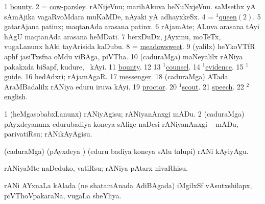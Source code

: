 \noindent
\gl{\pagu}
\expl{}
\bmng
\bnum
\num{1}  \hyperref{kandict_b.pdf}{B}{bounty pagu(2)}{bounty}. 
\num{2}  = \hyperref{kandict_c.pdf}{C}{cow-parsley}{cow-parsley}. 
  
\banum
{} rANijeVnu; marihAkuva heNuNxjeVnu. 
 saMsethx yA sAmAjika vagaRvoMdara muKaMDe, nAyaki yA adhayxkeSx. 
\eanum
\numie
\num{4}  = \hyperlink{queen(1)2}{$^1$queen\((2)\)}. 
\num{5}  gatarAjana patinx; maqtanAda arasana patinx. 
\num{6}  rAjamAte; ALuva arasana tAyi hAgU maqtanAda arasana heMDati. 
\num{7}  berxDuDx, jAyxmu, moTeTx, \mo vugaLanunx hAki tayArisida kaDubu. 
\num{8}  = \hyperref{kandict_m.pdf}{M}{meadowsweet}{meadowsweet}. 
\num{9}  (\UK yalilx) heYkoVTfR aphf jasiTxsfna oMdu viBAga, piVTha. 
\num{10}  (caduraMga) maNeyalilx rANiya pakakxda biSapf, kudure, \mo\ kAyi. 
\num{11}  \hyperref{kandict_b.pdf}{B}{bounty pagu(3)}{bounty}. 
\num{12}  
\num{13}  \hyperref{kandict_c.pdf}{C}{counsel(1) pagu(2)}{$^1$counsel}. 
\num{14}  \hyperref{kandict_e.pdf}{E}{evidence(1) nuga}{$^1$evidence}. 
\num{15}  \hyperref{kandict_g.pdf}{G}{guide(1) pagu}{$^1$guide}. 
\num{16}  hedAdxri; rAjamAgaR. 
\num{17}  \hyperref{kandict_m.pdf}{M}{messenger pagu(2)}{messenger}. 
\num{18}  (caduraMga) ATada AraMBadalilx rANiya eduru iruva kAyi. 
\num{19}  \hyperref{kandict_p.pdf}{P}{proctor pagu}{proctor}. 
\num{20}  \hyperref{kandict_s.pdf}{S}{scout(1) pagu}{$^1$scout}. 
\num{21}  \hyperref{kandict_s.pdf}{S}{speech pagu(5)}{speech}. 
\num{22}  \hyperref{kandict_e.pdf}{E}{english(2) pagu(6)}{$^2$english}. 
\enum
\emng
\eentry

\bentry
{} 
\gl{\sakirx}
\expl{}
\bmng
\bnum
\num{1} (heMgasobabxLanunx) rANiyAgisu; rANiyanAnxgi mADu. 
\num{2} (caduraMga) pAyxdeyanunx edurubadiya koneya sAlige naDesi rANiyanAnxgi -- mADu, parivatiRsu; rANikAyAgisu. 
\enum
\emng

\noindent
\gl{\akirx}
\bmng
(caduraMga) (pAyxdeya \vi) (eduru badiya koneya sAlu talupi) rANi kAyiyAgu. 
\emng

\noindent
\gl{\pagu}
\bmng
{} rANiyaMte naDeduko, vatiRsu; rANiya pAtarx nivaRhisu. 
\emng
\eentry

\bentry
{} 
\gl{\gu}
\expl{}
\bmng
rANi AYxnaLa kAlada (ne shatamAnada AdiBAgada) iMgilxSf vAsutxshilapx, piVThoVpakaraNa, \mo vugaLa sheYliya. 
\emng
\eentry

